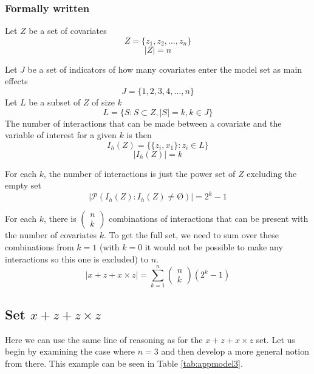 \subsubsection{Formally written}
Let $Z$ be a set of covariates 
\[Z=\{\left.z_1,z_2,\dots ,z_n\right.\}\] \[|Z|=n\] 

Let $J$ be a set of indicators of how many covariates enter the model set as main effects
\[J=\{\left.1,2,3,4,\dots ,n\right.\}\] 
Let $L$ be a subset of $Z$ of size $k$
\[L=\{\left.S:S\subset Z,\left|S\right|=k,k\in J\right.\}\] 
The number of interactions that can be made between a covariate and the variable of interest for a given $k$ is then
\[I_h\left(Z\right)=\{\{\left.\left.z_i,x_1\right.\}:z_i\in L\right.\}\] 
\[\left|I_h\left(Z\right)\right|=k\] 

For each $k$, the number of interactions is just the power set of $Z$ excluding the empty set
\[\left|\mathcal{P}\left(I_h\left(Z\right):I_h\left(Z\right)\neq \textrm{\O}\right)\right|=2^k-1\] 

For each $k$, there is $\left( \begin{array}{c}
n \\ 
k \end{array}
\right)$ combinations of interactions that can be present with the number of covariates $k$. To get the full set, we need to sum over these combinations from $k=1$ (with $k=0$ it would not be possible to make any interactions so this one is excluded) to $n$.
\[\left|x + z + x \times z\right|=\sum^n_{k=1}{\left( \begin{array}{c}
n \\ 
k \end{array}
\right)\left(2^k-1\right)}\] 
\subsection{Set $x + z + z \times z$}

Here we can use the same line of reasoning as for the $x + z + x \times z$ set. Let us begin by examining the case where $n=3$ and then develop a more general notion from there. This example can be seen in Table \ref{tab:appmodel3}. 

